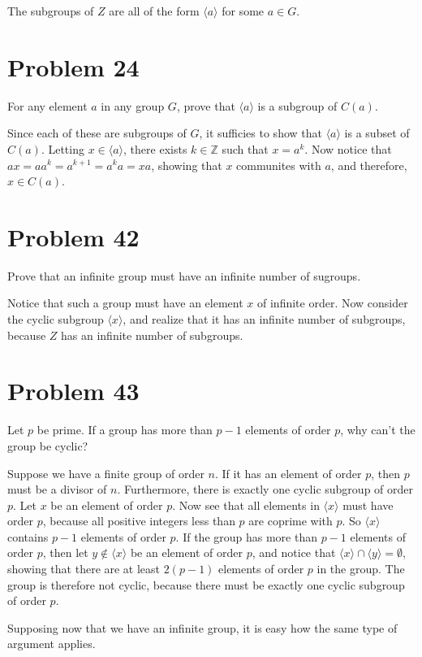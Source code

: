 \documentclass[12pt]{article}
\newcommand{\Z}{\mathbb{Z}}
\begin{document}
The subgroups of $Z$ are all of the form $\langle a\rangle$ for some $a\in G$.

\section*{Problem 24}

For any element $a$ in any group $G$, prove that $\langle a\rangle$ is a subgroup of $C(a)$.

Since each of these are subgroups of $G$, it sufficies to show that $\langle a\rangle$ is a subset
of $C(a)$.  Letting $x\in\langle a\rangle$, there exists $k\in\Z$ such that $x=a^k$.
Now notice that $ax=aa^k=a^{k+1}=a^ka=xa$, showing that $x$ communites with $a$,
and therefore, $x\in C(a)$.

\section*{Problem 42}

Prove that an infinite group must have an infinite number of sugroups.

Notice that such a group must have an element $x$ of infinite order.
Now consider the cyclic subgroup $\langle x\rangle$, and realize that
it has an infinite number of subgroups, because $Z$ has an infinite
number of subgroups.

\section*{Problem 43}

Let $p$ be prime.  If a group has more than $p-1$ elements of order $p$,
why can't the group be cyclic?

Suppose we have a finite group of order $n$.  If it has an element of order $p$,
then $p$ must be a divisor of $n$.  Furthermore, there is exactly one cyclic
subgroup of order $p$.  Let $x$ be an element of order $p$.  Now see that all elements in $\langle x\rangle$ must
have order $p$, because all positive integers less than $p$ are coprime with $p$.
So $\langle x\rangle$ contains $p-1$ elements of order $p$.  If the group
has more than $p-1$ elements of order $p$, then let $y\not\in\langle x\rangle$
be an element of order $p$, and notice that $\langle x\rangle\cap\langle y\rangle=\emptyset$,
showing that there are at least $2(p-1)$ elements of order $p$ in the group.
The group is therefore not cyclic, because there must be exactly one cyclic subgroup
of order $p$.

Supposing now that we have an infinite group, it is easy how the same type
of argument applies.
\end{document}
